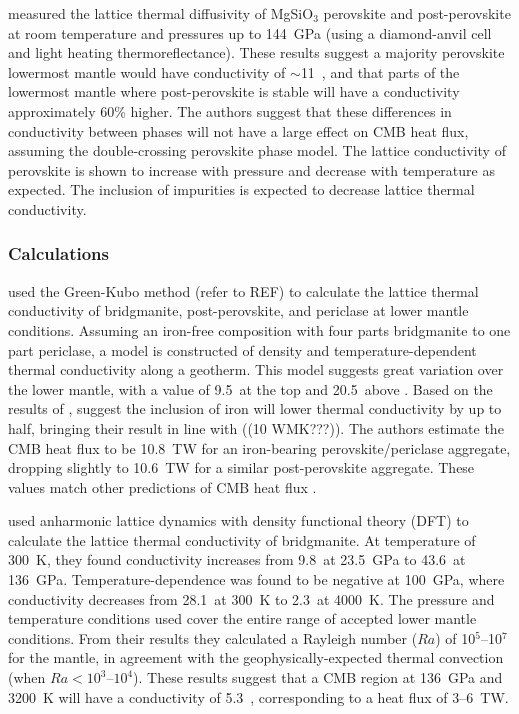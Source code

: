 \citet{Ohta2012} measured the lattice thermal diffusivity of MgSiO$_3$ perovskite and post-perovskite at room temperature and pressures up to 144~GPa (using a diamond-anvil cell and light heating thermoreflectance). These results suggest a majority perovskite lowermost mantle would have conductivity of $\sim$11~\wmk, and that parts of the lowermost mantle where post-perovskite is stable will have a conductivity approximately 60\% higher. The authors suggest that these differences in conductivity between phases will not have a large effect on CMB heat flux, assuming the double-crossing perovskite phase model. The lattice conductivity of \mgsios perovskite is shown to increase with pressure and decrease with temperature as expected. The inclusion of impurities is expected to decrease lattice thermal conductivity.

\subsubsection{Calculations}

\citet{Haigis2012} used the Green-Kubo method (refer to REF) to calculate the lattice thermal conductivity of bridgmanite, post-perovskite, and periclase at lower mantle conditions. Assuming an iron-free composition with four parts bridgmanite to one part periclase, a model is constructed of density and temperature-dependent thermal conductivity along a geotherm. This model suggests great variation over the lower mantle, with a value of 9.5~\wmks at the top and 20.5~\wmks above \ddd. Based on the results of \citet{Manthilake2011}, \citeauthor{Haigis2012} suggest the inclusion of iron will lower thermal conductivity by up to half, bringing their result in line with \citet{Lay2006} ((10 WMK???)). The authors estimate the CMB heat flux to be 10.8~TW for an iron-bearing perovskite/periclase aggregate, dropping slightly to 10.6~TW for a similar post-perovskite aggregate. These values match other predictions of CMB heat flux \citep[e.g.][]{Lay2008}.

\citet{Dekura2013} used \ais anharmonic lattice dynamics with density functional theory (DFT) to calculate the lattice thermal conductivity of bridgmanite. At temperature of 300~K, they found conductivity increases from 9.8~\wmks at 23.5~GPa to 43.6~\wmks at 136~GPa. Temperature-dependence was found to be negative at 100~GPa, where conductivity decreases from 28.1~\wmks at 300~K to 2.3~\wmks at 4000~K. The pressure and temperature conditions used cover the entire range of accepted lower mantle conditions. From their results they calculated a Rayleigh number ($Ra$) of 10$^5$--10$^7$ for the mantle, in agreement with the geophysically-expected thermal convection (when $Ra < 10^3$--$10^4$). These results suggest that a CMB region at 136~GPa and 3200~K will have a conductivity of 5.3~\wmk, corresponding to a heat flux of 3--6~TW.

